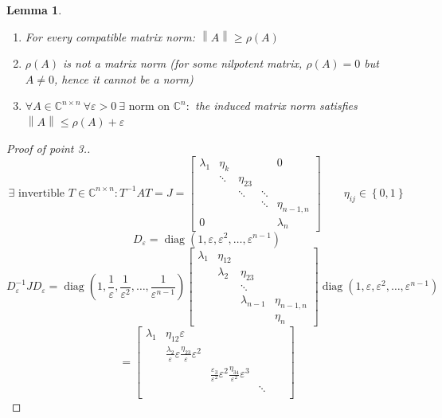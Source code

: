 \documentclass[a4paper]{article}
\newcounter{lecref}[section]
\numberwithin{lecref}{section}
\newtheorem{lemma}[lecref]{Lemma}
\newcommand{\set}[1]{\left\{#1\right\}}
\newcommand{\norm}[1]{\left\|#1\right\|}
\begin{document}
\begin{lemma} %
  \begin{enumerate}
    \item For every compatible matrix norm: $\norm{A} \geq \rho(A)$
    \item $\rho(A)$ is not a matrix norm (for some nilpotent matrix, $\rho(A) = 0$ but $A \neq 0$, hence it cannot be a norm)
    \item $\forall A \in \mathbb C^{n \times n} \: \forall \varepsilon > 0 \:\exists \text{ norm on } \mathbb C^n:$ the induced matrix norm satisfies $\norm{A} \leq \rho(A) + \varepsilon$
  \end{enumerate}
\end{lemma}

\begin{proof}[Proof of point 3.]
  \[ \exists \text{ invertible } T \in \mathbb C^{n \times n}: T^{-1} AT = J = \begin{bmatrix} \lambda_1 & \eta_k & & & 0 \\ & \ddots & \eta_{23} & & \\ & & \ddots & \ddots & \\ & & & \ddots & \eta_{n-1,n} \\ 0 & & & & \lambda_n \end{bmatrix} \qquad \eta_{ij} \in \set{0,1} \]
  \[ D_{\varepsilon} = \operatorname{diag}(1, \varepsilon, \varepsilon^2, \dots, \varepsilon^{n-1}) \]
  \[
    D_{\varepsilon}^{-1} J D_{\varepsilon}
      = \operatorname{diag}(1, \frac1\varepsilon, \frac1{\varepsilon^2}, \dots, \frac{1}{\varepsilon^{n-1}})
      \begin{bmatrix} \lambda_1 & \eta_{12} & & \\ & \lambda_2 & \eta_{23} & \\ & & \ddots & \\ & & \lambda_{n-1} & \eta_{n-1,n} \\ & & & \eta_{n} \end{bmatrix}
      \operatorname{diag}(1, \varepsilon, \varepsilon^2, \dots, \varepsilon^{n-1})
  \] \[
      = \begin{bmatrix}
        \lambda_1 & \eta_{12} \varepsilon & & & & \\
          & \frac{\lambda_2}{\varepsilon} \varepsilon \frac{\eta_{23}}{\varepsilon} \varepsilon^2  & & & & \\
          & & \frac{\varepsilon_{3}}{\varepsilon^2} \varepsilon^2 \frac{\eta_{34}}{\varepsilon^2} \varepsilon^3 & & & \\
          & & & \ddots & & \\

\end{bmatrix}\]
\end{proof}
\end{document}
